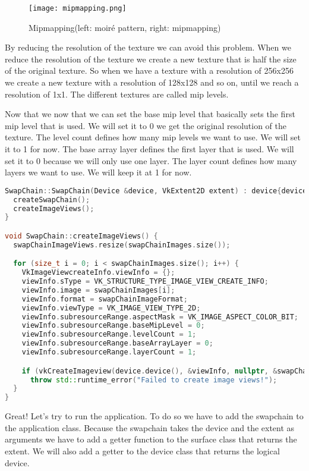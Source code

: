 \documentclass[12pt]{report} \usepackage{preamble}
\begin{document}
\begin{figure}[htbp]
	\centering
	\texttt{[image: mipmapping.png]}
	\caption{Mipmapping(left: moiré pattern, right: mipmapping)} \cite{fig:mipmapping}
\end{figure}

By reducing the resolution of the texture we can avoid this problem.
When we reduce the resolution of the texture we create a new texture that is half the size of the original texture.
So when we have a texture with a resolution of 256x256 we create a new texture with a resolution of 128x128 and so on,
until we reach a resolution of 1x1. The different textures are called mip levels.

Now that we now that we can set the base mip level that basically sets the first mip level that is used. We will set it to 0
we get the original resolution of the texture. The level count defines how many mip levels we want to use. We will set it to 1
for now. The base array layer defines the first layer that is used. We will set it to 0 because we will only use one layer.
The layer count defines how many layers we want to use. We will keep it at 1 for now.

\begin{lstlisting}[language=C++]
SwapChain::SwapChain(Device &device, VkExtent2D extent) : device{device}, windowExtent{extent} {
  createSwapChain();
  createImageViews();
}

void SwapChain::createImageViews() {
  swapChainImageViews.resize(swapChainImages.size());

  for (size_t i = 0; i < swapChainImages.size(); i++) {
    VkImageViewcreateInfo.viewInfo = {};
    viewInfo.sType = VK_STRUCTURE_TYPE_IMAGE_VIEW_CREATE_INFO;
    viewInfo.image = swapChainImages[i];
    viewInfo.format = swapChainImageFormat;
    viewInfo.viewType = VK_IMAGE_VIEW_TYPE_2D;
    viewInfo.subresourceRange.aspectMask = VK_IMAGE_ASPECT_COLOR_BIT;
    viewInfo.subresourceRange.baseMipLevel = 0;
    viewInfo.subresourceRange.levelCount = 1;
    viewInfo.subresourceRange.baseArrayLayer = 0;
    viewInfo.subresourceRange.layerCount = 1;

    if (vkCreateImageview(device.device(), &viewInfo, nullptr, &swapChainImageViews[i]) != VK_SUCCESS)
      throw std::runtime_error("Failed to create image views!");
  }
}
\end{lstlisting}

Great! Let's try to run the application. To do so we have to add the swapchain to the application class.
Because the swapchain takes the device and the extent as arguments we have to add a getter function to the
surface class that returns the extent. We will also add a getter to the device class that returns the
logical device.
\end{document}
